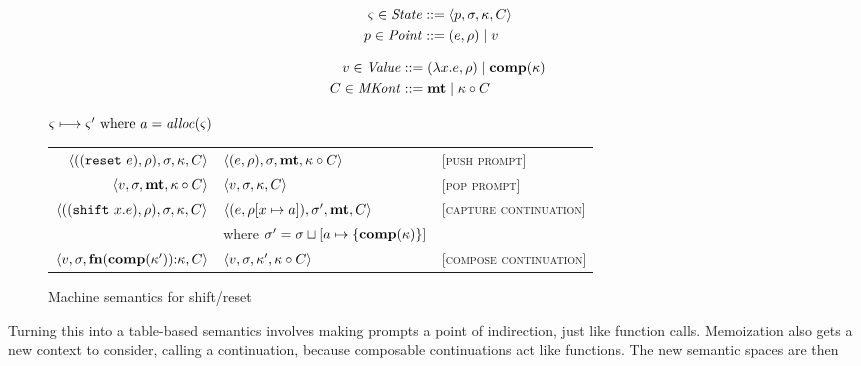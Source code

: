 \begin{center}
  \begin{minipage}{0.45\linewidth}
    \begin{align*}
      \varsigma \in \mathit{State} &::= \langle p, \sigma, \kappa, C \rangle \\
      p \in \mathit{Point} &::= (e, \rho) \mathrel{\mid} v
    \end{align*}
  \end{minipage}
  \begin{minipage}{0.50\linewidth}
    \begin{align*}
      v \in \mathit{Value} &::= (\lambda{} x. e, \rho) \mathrel{\mid} \mathbf{comp}(\kappa) \\
      C \in \mathit{MKont} &::= \mathbf{mt} \mathrel{\mid} \kappa\circ C
    \end{align*}
  \end{minipage}
\end{center}
\begin{figure}
  \centering
  $\varsigma \longmapsto \varsigma' \text{ where } a = \mathit{alloc}(\varsigma)$ \\
  \begin{tabular}{r|ll}
    \hline
    $\langle ((\texttt{reset}\ e), \rho), \sigma, \kappa, C \rangle$
    &
    $\langle (e, \rho), \sigma, \mathbf{mt}, \kappa\circ C \rangle$
    &
    \textsc{[push prompt]}
    \\
    $\langle v, \sigma, \mathbf{mt}, \kappa\circ C \rangle$
    &
    $\langle v, \sigma, {\kappa}, {C} \rangle$
    &
    \textsc{[pop prompt]}
    \\
    $\langle ((\texttt{shift}\ x. e), \rho), \sigma, \kappa, C \rangle$
    &
    $\langle (e, \rho[x \mapsto a]), \sigma',\mathbf{mt},C \rangle$
    &
    \textsc{[capture continuation]}
    \\ & where $\sigma' = \sigma\sqcup[a \mapsto \{ \mathbf{comp}(\kappa) \}]$
    \\
    $\langle v,\sigma,\mathbf{fn}{}(\mathbf{comp}(\kappa')){\tt :} \kappa, C \rangle$
    &
    $\langle v, \sigma, \kappa', \kappa\circ C \rangle$
    &
    \textsc{[compose continuation]}
  \end{tabular}  
  \caption{Machine semantics for shift/reset}
  \label{fig:shift-reset}
\end{figure}

Turning this into a table-based semantics involves making prompts a point of indirection, just like function calls.
%
Memoization also gets a new context to consider, calling a continuation, because composable continuations act like functions.
%
The new semantic spaces are then

